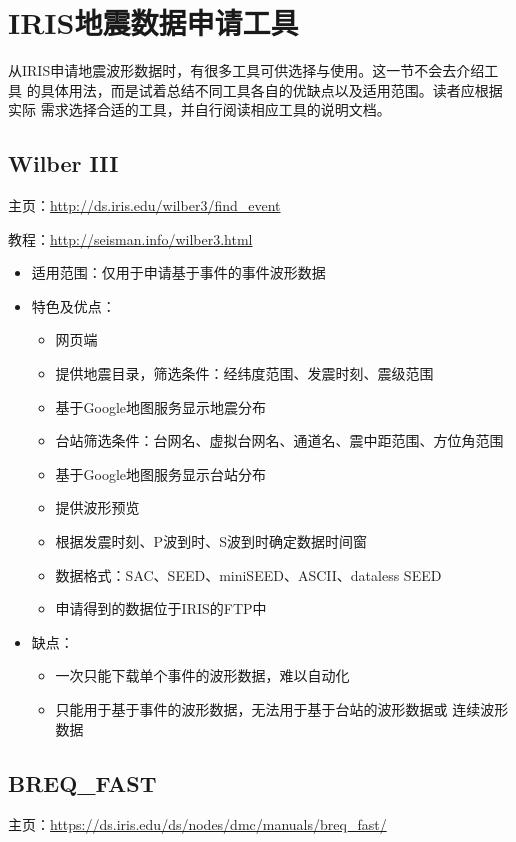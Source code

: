 \section{IRIS地震数据申请工具}
从IRIS申请地震波形数据时，有很多工具可供选择与使用。这一节不会去介绍工具
的具体用法，而是试着总结不同工具各自的优缺点以及适用范围。读者应根据实际
需求选择合适的工具，并自行阅读相应工具的说明文档。

\subsection{Wilber III}
主页：\url{http://ds.iris.edu/wilber3/find_event}

教程：\url{http://seisman.info/wilber3.html}

\begin{itemize}
\item 适用范围：仅用于申请基于事件的事件波形数据
\item 特色及优点：
    \begin{itemize}
    \item 网页端
    \item 提供地震目录，筛选条件：经纬度范围、发震时刻、震级范围
    \item 基于Google地图服务显示地震分布
    \item 台站筛选条件：台网名、虚拟台网名、通道名、震中距范围、方位角范围
    \item 基于Google地图服务显示台站分布
    \item 提供波形预览
    \item 根据发震时刻、P波到时、S波到时确定数据时间窗
    \item 数据格式：SAC、SEED、miniSEED、ASCII、dataless SEED
    \item 申请得到的数据位于IRIS的FTP中
    \end{itemize}
\item 缺点：
    \begin{itemize}
    \item 一次只能下载单个事件的波形数据，难以自动化
    \item 只能用于基于事件的波形数据，无法用于基于台站的波形数据或
        连续波形数据
    \end{itemize}
\end{itemize}

\subsection{BREQ\_FAST}
主页：\url{https://ds.iris.edu/ds/nodes/dmc/manuals/breq_fast/}

